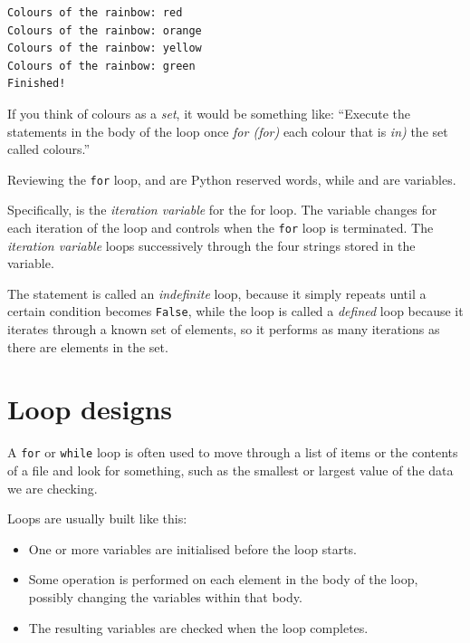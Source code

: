 \begin{Verbatim}[frame=single]
Colours of the rainbow: red
Colours of the rainbow: orange
Colours of the rainbow: yellow
Colours of the rainbow: green
Finished!
\end{Verbatim}

If you think of colours as a \emph{set}, it would be something like: ``Execute the statements in the body of the loop once \emph{for (for)} each colour that is \emph{in)} the set called colours.''

Reviewing the \texttt{for} loop,  and  are Python reserved words, while  and  are variables.

Specifically,  is the \emph{iteration variable} for the for loop. The variable  changes for each iteration of the loop and controls when the \texttt{for} loop is terminated. The \emph{iteration variable} loops successively through the four strings stored in the  variable.


The  statement is called an \emph{indefinite} loop, because it simply repeats until a certain condition becomes \texttt{False}, while the  loop is called a \emph{defined} loop because it iterates through a known set of elements, so it performs as many iterations as there are elements in the set.




\hypertarget{diseuxf1os-de-bucles}{%
\section{Loop designs}\label{diseuxf1os-de-bucles}}

A \texttt{for} or \texttt{while} loop is often used to move through a list of items or the contents of a file and look for something, such as the smallest or largest value of the data we are checking.

Loops are usually built like this:

\begin{itemize}[nosep]
\item
  One or more variables are initialised before the loop starts.
\item
  Some operation is performed on each element in the body of the loop, possibly changing the variables within that body.
\item
  The resulting variables are checked when the loop completes.
\end{itemize}

